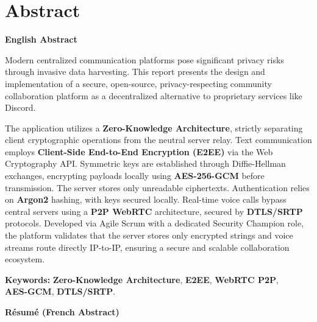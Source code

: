 
\chapter*{Abstract}


\noindent \textbf{\Large English Abstract}
\vspace{0.5em}

Modern centralized communication platforms pose significant privacy risks through invasive data harvesting. This report presents the design and implementation of a secure, open-source, privacy-respecting community collaboration platform as a decentralized alternative to proprietary services like Discord.

The application utilizes a \textbf{Zero-Knowledge Architecture}, strictly separating client cryptographic operations from the neutral server relay. Text communication employs \textbf{Client-Side End-to-End Encryption (E2EE)} via the Web Cryptography API. Symmetric keys are established through Diffie-Hellman exchanges, encrypting payloads locally using \textbf{AES-256-GCM} before transmission. The server stores only unreadable ciphertexts. Authentication relies on \textbf{Argon2} hashing, with keys secured locally. Real-time voice calls bypass central servers using a \textbf{P2P WebRTC} architecture, secured by \textbf{DTLS/SRTP} protocols. Developed via Agile Scrum with a dedicated Security Champion role, the platform validates that the server stores only encrypted strings and voice streams route directly IP-to-IP, ensuring a secure and scalable collaboration ecosystem.

\vspace{1em}

\noindent \textbf{\Large Keywords:}
\textbf{Zero-Knowledge Architecture}, \textbf{E2EE}, \textbf{WebRTC P2P},\\
\textbf{AES-GCM}, \textbf{DTLS/SRTP}.

\vspace{1cm}

\noindent \textbf{\Large Résumé (French Abstract)}
\vspace{0.5em}

